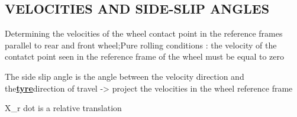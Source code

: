 \documentclass{article}
\begin{document}
\subsection{\textbf{VELOCITIES AND SIDE-SLIP ANGLES}}
\begin{maplegroup}
\begin{Maple Normal}{
Determining the velocities of the wheel contact point in the reference frames parallel to rear and front wheel;Pure rolling conditions : the velocity of the contatct point seen in the reference frame of the wheel must be equal to zero
}\end{Maple Normal}

\end{maplegroup}
\begin{maplegroup}
\begin{Maple Normal}{
The side slip angle is the angle between the velocity direction and the\underline{\textbf{tyre}}direction of travel -> project the velocities in the wheel reference frame}\end{Maple Normal}

\begin{Maple Normal}{
X\_r dot is a relative translation}\end{Maple Normal}
\end{maplegroup}
\begin{maplegroup}
\begin{mapleinput}
\end{mapleinput}
\mapleresult
\begin{maplelatex}
\end{maplelatex}
\end{maplegroup}
\begin{maplegroup}
\begin{mapleinput}
\end{mapleinput}
\mapleresult
\begin{maplelatex}
\end{maplelatex}
\mapleresult
\begin{maplelatex}
\end{maplelatex}
\end{maplegroup}
\end{document}
